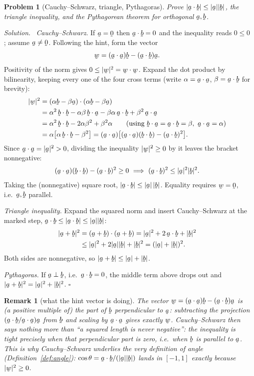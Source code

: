 \documentclass[17pt,a4paper]{extreport}
\DeclareRobustCommand{\vek}[1]{\underaccent{\tilde}{#1}}
\newcommand{\ba}{\vek{a}}
\newcommand{\bb}{\vek{b}}
\newcommand{\bw}{\vek{w}}
\newcommand{\bze}{\vek{0}}
\newcommand{\ip}[2]{#1\cdot#2}
\theoremstyle{scplain}
\theoremstyle{scdefn}
\newtheorem{remark}[theorem]{Remark}
\theoremstyle{scplain}
\newtheorem{problem}{Problem}
\newenvironment{solution}
 {\par\smallskip\noindent\textit{Solution.}\ }
 {\hfill$\square$\par\medskip}
\begin{document}
\begin{problem}[Cauchy--Schwarz, triangle, Pythagoras]
Prove $|\ip\ba\bb|\le|\ba||\bb|$, the triangle inequality, and the
Pythagorean theorem for orthogonal $\ba,\bb$.
\end{problem}
\begin{solution}
\emph{Cauchy--Schwarz.} If $\ba=\bze$ then $\ip\ba\bb=0$ and the inequality
reads $0\le0$; assume $\ba\neq\bze$. Following the hint, form the vector
\[
\bw=(\ip\ba\ba)\bb-(\ip\ba\bb)\ba .
\]
Positivity of the norm gives $0\le|\bw|^2=\ip\bw\bw$. Expand the dot product
by bilinearity, keeping every one of the four cross terms (write
$\alpha=\ip\ba\ba$, $\beta=\ip\ba\bb$ for brevity):
\[
\begin{aligned}
|\bw|^2&=\ip{(\alpha\bb-\beta\ba)}{(\alpha\bb-\beta\ba)}\\
&=\alpha^2\,\ip\bb\bb-\alpha\beta\,\ip\bb\ba-\beta\alpha\,\ip\ba\bb
 +\beta^2\,\ip\ba\ba\\
&=\alpha^2\,\ip\bb\bb-2\alpha\beta^2+\beta^2\alpha
 \qquad(\text{using }\ip\bb\ba=\ip\ba\bb=\beta,\ \ip\ba\ba=\alpha)\\
&=\alpha\big[\alpha\,\ip\bb\bb-\beta^2\big]
 =(\ip\ba\ba)\big[(\ip\ba\ba)(\ip\bb\bb)-(\ip\ba\bb)^2\big].
\end{aligned}
\]
Since $\ip\ba\ba=|\ba|^2>0$, dividing the inequality $|\bw|^2\ge0$ by it
leaves the bracket nonnegative:
\[
(\ip\ba\ba)(\ip\bb\bb)-(\ip\ba\bb)^2\ge0
\ \Longrightarrow\ (\ip\ba\bb)^2\le|\ba|^2|\bb|^2 .
\]
Taking the (nonnegative) square root, $|\ip\ba\bb|\le|\ba|\,|\bb|$. Equality
requires $\bw=\bze$, i.e.\ $\ba,\bb$ parallel.

\emph{Triangle inequality.} Expand the squared norm and insert
Cauchy--Schwarz at the marked step, $\ip\ba\bb\le|\ip\ba\bb|\le|\ba||\bb|$:
\[
\begin{aligned}
|\ba+\bb|^2&=\ip{(\ba+\bb)}{(\ba+\bb)}=|\ba|^2+2\,\ip\ba\bb+|\bb|^2\\
&\le|\ba|^2+2|\ba||\bb|+|\bb|^2=(|\ba|+|\bb|)^2 .
\end{aligned}
\]
Both sides are nonnegative, so $|\ba+\bb|\le|\ba|+|\bb|$.

\emph{Pythagoras.} If $\ba\perp\bb$, i.e.\ $\ip\ba\bb=0$, the middle term
above drops out and $|\ba+\bb|^2=|\ba|^2+|\bb|^2$.
\end{solution}

\begin{remark}[what the hint vector is doing]\label{rem:csuse}
The vector $\bw=(\ip\ba\ba)\bb-(\ip\ba\bb)\ba$ is (a positive multiple of)
the part of $\bb$ \emph{perpendicular} to $\ba$: subtracting the projection
$(\ip\ba\bb/\ip\ba\ba)\ba$ from $\bb$ and scaling by $\ip\ba\ba$ gives
exactly $\bw$. Cauchy--Schwarz then says nothing more than ``a squared
length is never negative'': the inequality is tight precisely when that
perpendicular part is zero, i.e.\ when $\bb$ is parallel to $\ba$. This is
why Cauchy--Schwarz underlies the very definition of angle
(Definition~\ref{def:angle}): $\cos\theta=\ip\ba\bb/(|\ba||\bb|)$ lands in
$[-1,1]$ exactly because $|\bw|^2\ge0$.
\end{remark}
\end{document}
